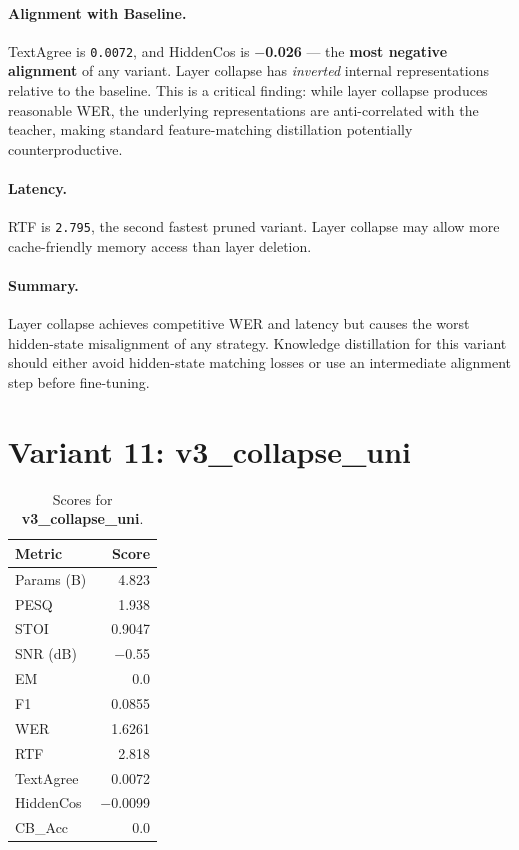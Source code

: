 \documentclass[11pt,a4paper]{article}
\newcommand{\scoreval}[1]{\texttt{#1}}
\newcommand{\bad}[1]{\textcolor{warnred}{\textbf{#1}}}
\begin{document}
\paragraph{Alignment with Baseline.}
TextAgree is \scoreval{0.0072}, and HiddenCos is \bad{$-$0.026} — the \textbf{most negative alignment} of any variant. Layer collapse has \emph{inverted} internal representations relative to the baseline. This is a critical finding: while layer collapse produces reasonable WER, the underlying representations are anti-correlated with the teacher, making standard feature-matching distillation potentially counterproductive.

\paragraph{Latency.}
RTF is \scoreval{2.795}, the second fastest pruned variant. Layer collapse may allow more cache-friendly memory access than layer deletion.

\paragraph{Summary.}
Layer collapse achieves competitive WER and latency but causes the worst hidden-state misalignment of any strategy. Knowledge distillation for this variant should either avoid hidden-state matching losses or use an intermediate alignment step before fine-tuning.

\newpage
\section{Variant 11: v3\_collapse\_uni}

\begin{table}[H]
\centering
\caption{Scores for \textbf{v3\_collapse\_uni}.}
\begin{tabular}{l r}
\toprule
\textbf{Metric} & \textbf{Score} \\
\midrule
Params (B)    & 4.823 \\
PESQ          & 1.938 \\
STOI          & 0.9047 \\
SNR (dB)      & $-$0.55 \\
EM            & 0.0 \\
F1            & 0.0855 \\
WER           & 1.6261 \\
RTF           & 2.818 \\
TextAgree     & 0.0072 \\
HiddenCos     & $-$0.0099 \\
CB\_Acc       & 0.0 \\
\bottomrule
\end{tabular}
\end{table}
\end{document}
